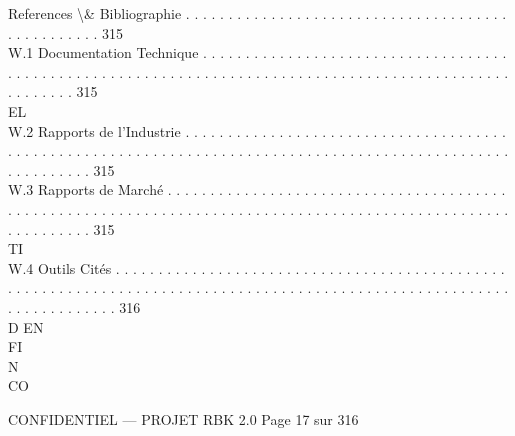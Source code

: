 \documentclass[12pt,landscape,a4paper]{article}
\newenvironment{confidential}
{\begin{tcolorbox}[
    colback=rbkred!5!white,
    colframe=rbkred!75!black,
    title=CONFIDENTIEL,
    fonttitle=\bfseries\color{white},
    coltitle=rbkred!75!black,
    breakable,
    enhanced,
    frame hidden,
    borderline west={2pt}{0pt}{rbkred!75!black}
]}
{\end{tcolorbox}}
\begin{document}
References \textbackslash{}& Bibliographie . . . . . . . . . . . . . . . . . . . . . . . . . . . . . . . . . . . . . . . . . . . . . . . . . 315\\
W.1     Documentation Technique . . . . . . . . . . . . . . . . . . . . . . . . . . . . . . . . . . . . . . . . . . . . . . . . . . . . . . . . . . . . . . . . . . . . . . . . . . . . . . . . . . . . . . . . . . . . . . . . . . . . . . . 315\\
\vspace{0.5em}
\vspace{0.5em}
\vspace{0.5em}
\vspace{0.5em}
EL\\
W.2     Rapports de l’Industrie . . . . . . . . . . . . . . . . . . . . . . . . . . . . . . . . . . . . . . . . . . . . . . . . . . . . . . . . . . . . . . . . . . . . . . . . . . . . . . . . . . . . . . . . . . . . . . . . . . . . . . . . . . . 315\\
W.3     Rapports de Marché . . . . . . . . . . . . . . . . . . . . . . . . . . . . . . . . . . . . . . . . . . . . . . . . . . . . . . . . . . . . . . . . . . . . . . . . . . . . . . . . . . . . . . . . . . . . . . . . . . . . . . . . . . . . . 315\\
\vspace{0.5em}
\vspace{0.5em}
\vspace{0.5em}
\vspace{0.5em}
TI\\
W.4     Outils Cités . . . . . . . . . . . . . . . . . . . . . . . . . . . . . . . . . . . . . . . . . . . . . . . . . . . . . . . . . . . . . . . . . . . . . . . . . . . . . . . . . . . . . . . . . . . . . . . . . . . . . . . . . . . . . . . . . . . . . . 316\\
\vspace{0.5em}
\vspace{0.5em}
\vspace{0.5em}
\vspace{0.5em}
D            EN\\
FI\\
N\\
CO\\
\vspace{0.5em}
\vspace{0.5em}
\vspace{0.5em}
\vspace{0.5em}
\begin{confidential}CONFIDENTIEL — PROJET RBK 2.0                                                                                Page 17 sur 316\end{confidential}
\end{document}
